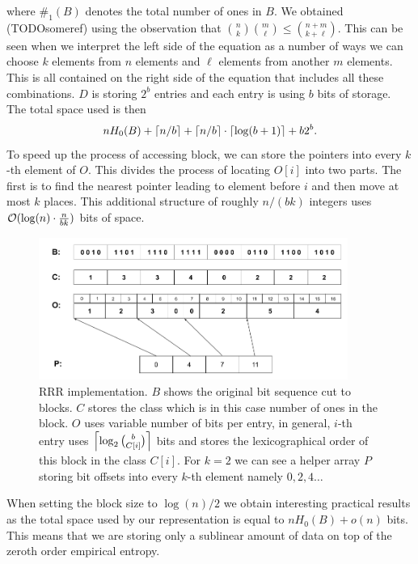 where $\#_1(B)$ denotes the total number of ones in $B$. We obtained (TODOsomeref) using the
observation that ${n\choose k} {m\choose \ell} \leq {n+m\choose k+\ell}$. This can be seen
when we interpret the left side of the equation as a number of ways we can choose $k$ elements
from $n$ elements and $\ell$ elements from another $m$ elements. This is all contained on the
right side of the equation that includes all these combinations. $D$ is storing $2^b$ entries
and each entry is using $b$ bits of storage. The total space used is then
$$nH_0(B) + \left\lceil n/b \right\rceil + \left\lceil n/b \right\rceil \cdot \left\lceil \log(b+1) \right\rceil + b2^b.$$ To speed up the process
of accessing block, we can store the pointers into every $k$-th element of $O$. This divides
the process of locating $O[i]$ into two parts. The first is to find the nearest pointer leading
to element before $i$ and then move at most $k$ places. This additional structure of roughly
$n/(bk)$ integers uses $\mathcal{O}(\log(n)\cdot \frac{n}{bk})$ bits of space.

\begin{figure}
	\centerline{
		\includegraphics[width=0.9\textwidth, height=0.3\textheight]{images/rrr}
	}
	\caption[TODO]{RRR implementation. $B$ shows the original bit sequence cut to
    blocks. $C$ stores the class which is in this case number of ones in the block.
    $O$ uses variable number of bits per entry, in general, $i$-th entry uses
    $\left\lceil \log_2{b\choose C[i]} \right\rceil$ bits and stores the lexicographical order
    of this block in the class $C[i]$. For $k=2$ we can see a helper array $P$
    storing bit offsets into every $k$-th element namely $0, 2, 4\ldots$
	}
	\label{obr:RRRFinal}
\end{figure}

When setting the block size to $\log(n)/2$ we obtain interesting practical results as
the total space used by our representation is equal to $nH_0(B) + o(n)$ bits. This means
that we are storing only a sublinear amount of data on top of the zeroth order empirical entropy.

